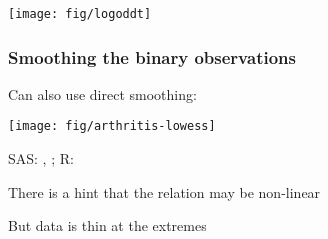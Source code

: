 \begin{frame}
\begin{center}
  \texttt{[image: fig/logoddt]}
\end{center}
\end{frame}

\begin{frame}
\frametitle{Smoothing the binary observations}
Can also use direct smoothing:
\begin{center}
  \texttt{[image: fig/arthritis-lowess]}
\end{center}
\begin{itemize*}
 \item SAS: , ; R: 
 \item There is a hint that the relation may be non-linear
 \item But data is thin at the extremes
\end{itemize*}

\end{frame}



